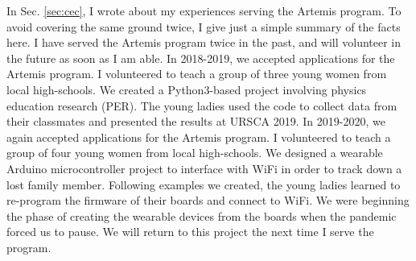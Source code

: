 \documentclass[../../../main.tex]{subfiles}
\begin{document}
In Sec. \ref{sec:cec}, I wrote about my experiences serving the Artemis program.  To avoid covering the same ground twice, I give just a simple summary of the facts here.  I have served the Artemis program twice in the past, and will volunteer in the future as soon as I am able.  In 2018-2019, we accepted applications for the Artemis program.  I volunteered to teach a group of three young women from local high-schools.  We created a Python3-based project involving physics education research (PER).  The young ladies used the code to collect data from their classmates and presented the results at URSCA 2019.  In 2019-2020, we again accepted applications for the Artemis program.  I volunteered to teach a group of four young women from local high-schools.  We designed a wearable Arduino microcontroller project to interface with WiFi in order to track down a lost family member.  Following examples we created, the young ladies learned to re-program the firmware of their boards and connect to WiFi.  We were beginning the phase of creating the wearable devices from the boards when the pandemic forced us to pause.  We will return to this project the next time I serve the program.
\end{document}
